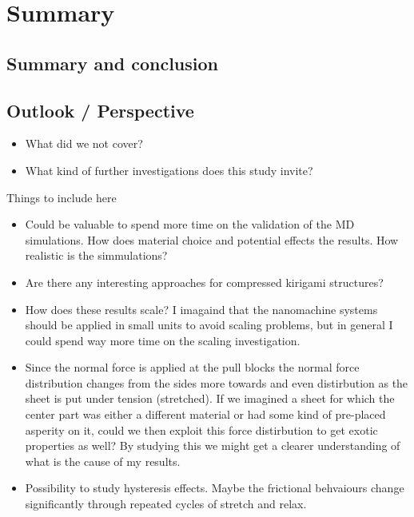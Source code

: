 \newpage
\chapter*{Summary}

\section{Summary and conclusion}

\section{Outlook / Perspective}

\begin{itemize}
  \item What did we not cover?
  \item What kind of further investigations does this study invite?
\end{itemize}


Things to include here
\begin{itemize}
  \item Could be valuable to spend more time on the validation of the MD simulations. How does material choice and potential effects the results. How realistic is the simmulations?
  \item Are there any interesting approaches for compressed kirigami structures?
  \item How does these results scale? I imagaind that the nanomachine systems should be applied in small units to avoid scaling problems, but in general I could spend way more time on the scaling investigation.
  \item Since the normal force is applied at the pull blocks the normal force distribution changes from the sides more towards and even distirbution as the sheet is put under tension (stretched). If we imagined a sheet for which the center part was either a different material or had some kind of pre-placed asperity on it, could we then exploit this force distirbution to get exotic properties as well? By studying this we might get a clearer understanding of what is the cause of my results. 
  \item Possibility to study hysteresis effects. Maybe the frictional behvaiours change significantly through repeated cycles of stretch and relax. 
\end{itemize}



